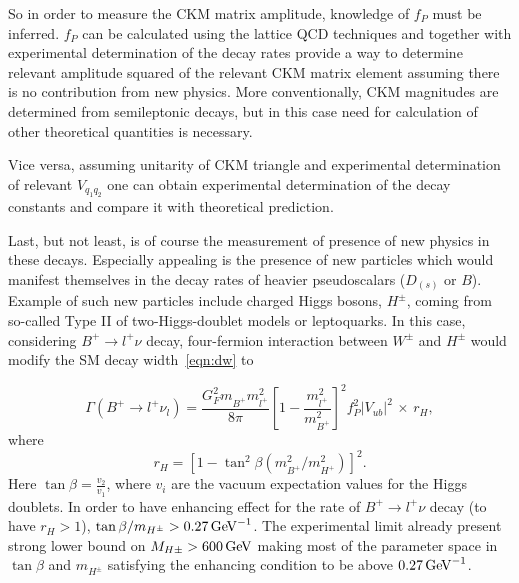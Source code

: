 So in order to measure the \gls{CKM} matrix amplitude, knowledge of $f_{P}$ must be inferred. $f_{P}$ can be calculated using the lattice \gls{QCD} techniques and together with experimental determination of the decay rates provide a way to determine relevant amplitude squared of the relevant \gls{CKM} matrix element assuming there is no contribution from new physics. More conventionally, \gls{CKM} magnitudes are determined from semileptonic decays, but in this case need for calculation of other theoretical quantities is necessary.  

Vice versa, assuming unitarity of \gls{CKM} triangle and experimental determination of relevant $V_{q_{1}q_{2}}$ one can obtain experimental determination of the decay constants and compare it with theoretical prediction.

Last, but not least, is of course the measurement of presence of new physics in these decays. Especially appealing is the presence of new particles which would manifest themselves in the decay rates of heavier pseudoscalars ($D_{(s)}$ or $B$). Example of such new particles include charged Higgs bosons, $H^{\pm}$, coming from so-called Type II of two-Higgs-doublet models \cite{Hou:1992sy}\cite{Akeroyd:2003zr}\cite{Dobrescu:2008er} or leptoquarks\cite{Dobrescu:2008er}. In this case, considering $B^{+}\rightarrow l^{+}\nu$ decay, four-fermion interaction between $W^{\pm}$ and $H^{\pm}$ would modify the \gls{SM} decay width~\autoref{eqn:dw} to

\begin{equation}
\Gamma(B^{+} \rightarrow {l^{+}} \nu_{l})=  
        \frac{G_{F}^{2} m^{}_{B^{+}}  m_{l^{+}}^{2}}{8\pi} 
        \left[1 - \frac{m_{l^{+}}^{2}}{m_{B^{+}}^{2}}\right]^{2}  
	f_{P}^{2} |V_{ub}|^{2} \,\times\, r_H,
\end{equation}
where
\begin{equation}
	r_H=[1-\tan^2\beta(m^{2}_{B^{+}}/m^{2}_{H^{+}})]^2.
\end{equation}
Here $\tan\beta = \frac{v_{2}}{v_{1}}$, where $v_{i}$ are the vacuum expectation values for the Higgs doublets. In order to have enhancing effect for the rate of $B^{+}\rightarrow l^{+}\nu$ decay (to have $r_{H}>1$), $\tan\beta/m_{H^{\pm}}> 0.27 \mathrm{\,Ge\kern -0.1em V}^{-1}$. The experimental limit already present strong lower bound on $M_{H\pm}>600\mathrm{\,Ge\kern -0.1em V}$\cite{Arbey:2017gmh} making most of the parameter space in $\tan\beta$ and $m_{H^{\pm}}$ satisfying the enhancing condition to be above $0.27 \mathrm{\,Ge\kern -0.1em V}^{-1}$.

